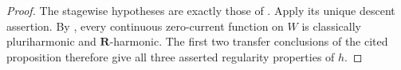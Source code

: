 \begin{proof}
The stagewise hypotheses are exactly those of
.  Apply its unique
descent assertion.  By
, every continuous
zero-current function on $W$ is classically pluriharmonic and
$\mathbf R$-harmonic.  The first two transfer conclusions of the cited
proposition therefore give all three asserted regularity properties of
$h$.
\end{proof}
